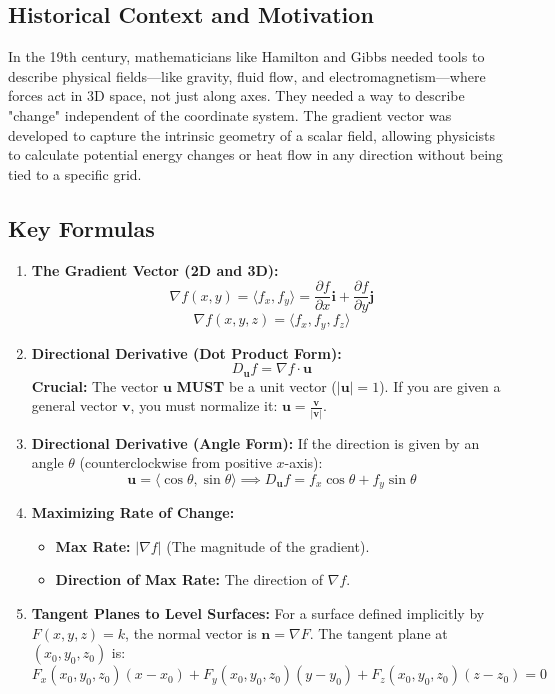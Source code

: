 \documentclass{article}
\begin{document}
\subsection{Historical Context and Motivation}
In the 19th century, mathematicians like Hamilton and Gibbs needed tools to describe physical fields—like gravity, fluid flow, and electromagnetism—where forces act in 3D space, not just along axes. They needed a way to describe "change" independent of the coordinate system. The gradient vector was developed to capture the intrinsic geometry of a scalar field, allowing physicists to calculate potential energy changes or heat flow in any direction without being tied to a specific grid.

\subsection{Key Formulas}
\begin{enumerate}
    \item \textbf{The Gradient Vector (2D and 3D):}
    \[ \nabla f(x, y) = \langle f_x, f_y \rangle = \frac{\partial f}{\partial x}\mathbf{i} + \frac{\partial f}{\partial y}\mathbf{j} \]
    \[ \nabla f(x, y, z) = \langle f_x, f_y, f_z \rangle \]

    \item \textbf{Directional Derivative (Dot Product Form):}
    \[ D_{\mathbf{u}}f = \nabla f \cdot \mathbf{u} \]
    \textbf{Crucial:} The vector $\mathbf{u}$ \textbf{MUST} be a unit vector ($|\mathbf{u}|=1$). If you are given a general vector $\mathbf{v}$, you must normalize it: $\mathbf{u} = \frac{\mathbf{v}}{|\mathbf{v}|}$.

    \item \textbf{Directional Derivative (Angle Form):}
    If the direction is given by an angle $\theta$ (counterclockwise from positive $x$-axis):
    \[ \mathbf{u} = \langle \cos\theta, \sin\theta \rangle \implies D_{\mathbf{u}}f = f_x \cos\theta + f_y \sin\theta \]

    \item \textbf{Maximizing Rate of Change:}
    \begin{itemize}
        \item \textbf{Max Rate:} $|\nabla f|$ (The magnitude of the gradient).
        \item \textbf{Direction of Max Rate:} The direction of $\nabla f$.
    \end{itemize}

    \item \textbf{Tangent Planes to Level Surfaces:}
    For a surface defined implicitly by $F(x, y, z) = k$, the normal vector is $\mathbf{n} = \nabla F$.
    The tangent plane at $(x_0, y_0, z_0)$ is:
    \[ F_x(x_0, y_0, z_0)(x - x_0) + F_y(x_0, y_0, z_0)(y - y_0) + F_z(x_0, y_0, z_0)(z - z_0) = 0 \]
\end{enumerate}
\end{document}
